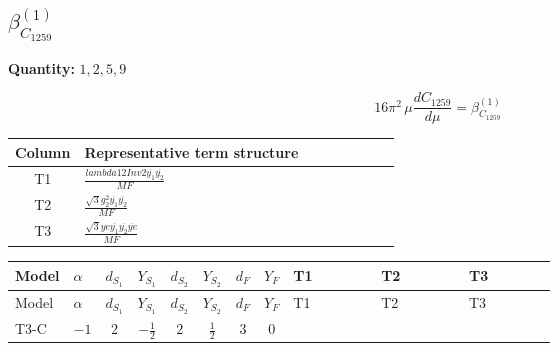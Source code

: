 \documentclass[8pt]{article}
\begin{document}
\begin{landscape}
\section*{$\beta_{C_{1259}}^{(1)}$}
\noindent\textbf{Quantity: }$\mathrm{1,2,5,9}$\par\smallskip
\[16\pi^2\,\mu\frac{d C_{1259}}{d\mu}=\beta_{C_{1259}}^{(1)}\]
\begin{center}
\begin{tabular}{@{}c >{\raggedright\arraybackslash}p{0.82\linewidth}@{}}
\toprule
Column & Representative term structure \\
\midrule
T1 & \(\displaystyle \frac{lambda12Inv2 \overline{y_{1}} \overline{y_{2}}}{MF}\) \\
\midrule
T2 & \(\displaystyle \frac{\sqrt{3} g_{2}^{2} \overline{y_{1}} \overline{y_{2}}}{MF}\) \\
\midrule
T3 & \(\displaystyle \frac{\sqrt{3} ye \overline{y_{1}} \overline{y_{2}} \overline{ye}}{MF}\) \\
\midrule
\bottomrule
\end{tabular}
\end{center}
\smallskip
\tiny
\begin{longtable}{@{}llcccccc >{\raggedright\arraybackslash}p{0.21\linewidth} >{\raggedright\arraybackslash}p{0.21\linewidth} >{\raggedright\arraybackslash}p{0.21\linewidth}@{}}
\toprule
Model & $\alpha$ & $d_{S_1}$ & $Y_{S_1}$ & $d_{S_2}$ & $Y_{S_2}$ & $d_F$ & $Y_F$ & T1 & T2 & T3 \\
\midrule
\endfirsthead
\toprule
Model & $\alpha$ & $d_{S_1}$ & $Y_{S_1}$ & $d_{S_2}$ & $Y_{S_2}$ & $d_F$ & $Y_F$ & T1 & T2 & T3 \\
\midrule
\endhead
T3-C & $-1$ & $2$ & $-\frac{1}{2}$ & $2$ & $\frac{1}{2}$ & $3$ & $0$ & \scriptsize\adjustbox{max width=\linewidth}{$\begin{gathered} - \frac{lambda12Inv2 \overline{y_{1}} \overline{y_{2}}}{6 MF}\end{gathered}$} & \scriptsize\adjustbox{max width=\linewidth}{$\begin{gathered} - \frac{\sqrt{3} g_{2}^{2} \overline{y_{1}} \overline{y_{2}}}{8 MF}\end{gathered}$} & \scriptsize\adjustbox{max width=\linewidth}{$\begin{gathered} \frac{\sqrt{3} ye \overline{y_{1}} \overline{y_{2}} \overline{ye}}{24 MF}\end{gathered}$} \\
\midrule
\bottomrule
\end{longtable}
\clearpage

\end{landscape}
\end{document}
